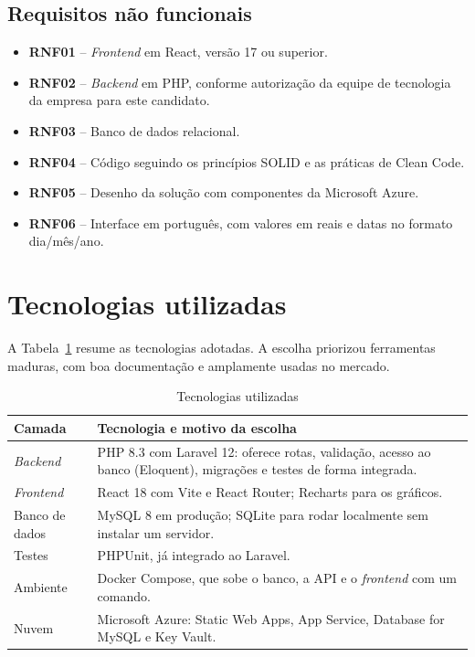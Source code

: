 \documentclass[12pt,a4paper]{article}
\newcommand{\fonte}[1]{\par\vspace{2pt}{\centering\small Fonte: #1\par}}
\begin{document}
\subsection{Requisitos não funcionais}

\begin{itemize}
  \item \textbf{RNF01} -- \emph{Frontend} em React, versão 17 ou superior.
  \item \textbf{RNF02} -- \emph{Backend} em PHP, conforme autorização da equipe de tecnologia da
        empresa para este candidato.
  \item \textbf{RNF03} -- Banco de dados relacional.
  \item \textbf{RNF04} -- Código seguindo os princípios SOLID e as práticas de Clean Code.
  \item \textbf{RNF05} -- Desenho da solução com componentes da Microsoft Azure.
  \item \textbf{RNF06} -- Interface em português, com valores em reais e datas no formato
        dia/mês/ano.
\end{itemize}

\section{Tecnologias utilizadas}\label{sec:tecnologias}

A Tabela~\ref{tab:tecnologias} resume as tecnologias adotadas. A escolha priorizou ferramentas
maduras, com boa documentação e amplamente usadas no mercado.

\begin{table}[H]
\centering
\caption{Tecnologias utilizadas}\label{tab:tecnologias}
\begin{tabularx}{\textwidth}{@{}lX@{}}
\toprule
Camada & Tecnologia e motivo da escolha \\
\midrule
\emph{Backend} & PHP 8.3 com Laravel 12: oferece rotas, validação, acesso ao banco
  (Eloquent), migrações e testes de forma integrada. \\
\emph{Frontend} & React 18 com Vite e React Router; Recharts para os gráficos. \\
Banco de dados & MySQL 8 em produção; SQLite para rodar localmente sem instalar um servidor. \\
Testes & PHPUnit, já integrado ao Laravel. \\
Ambiente & Docker Compose, que sobe o banco, a API e o \emph{frontend} com um comando. \\
Nuvem & Microsoft Azure: Static Web Apps, App Service, Database for MySQL e Key Vault. \\
\bottomrule
\end{tabularx}
\fonte{elaborado pelo autor (2026).}
\end{table}
\end{document}
